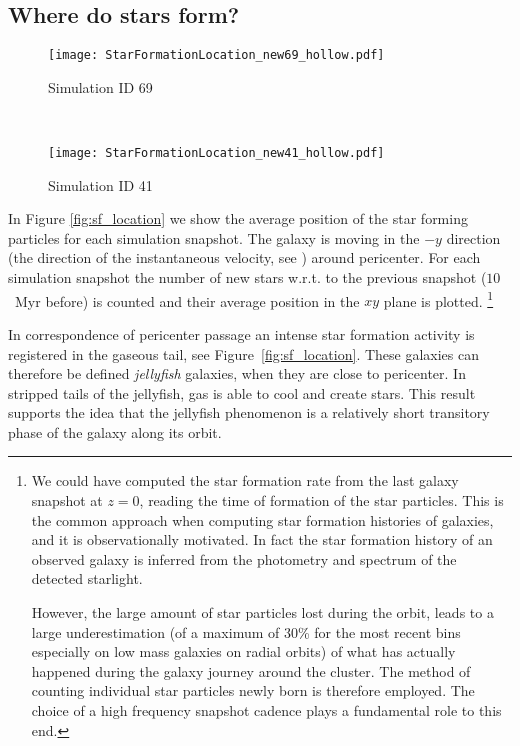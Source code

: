 \subsection{Where do stars form?}
\begin{figure*}
\centering
\begin{subfigure}[t]{0.74\textwidth}
\centering
\texttt{[image: StarFormationLocation\_new69\_hollow.pdf]}
\caption{Simulation ID 69}
\end{subfigure}\\[1.5ex]
\begin{subfigure}[t]{0.74\textwidth}
\centering
\texttt{[image: StarFormationLocation\_new41\_hollow.pdf]}
\caption{Simulation ID 41}
\end{subfigure}
\caption{Star formation location around first pericenter passage for simulation ID 69 and~41.
Each subpanel corresponds to a different pericenter.
The size of the marker is proportional to the number of stars born in that time interval.
Markers are colored according to the time from pericenter normalized with the radial period.}
\label{fig:sf_location}
\end{figure*}
In Figure \ref{fig:sf_location} we show the average position of the star forming particles for each simulation snapshot.
The galaxy is moving in the $-y$ direction (the direction of the instantaneous velocity, see ) around pericenter.
For each simulation snapshot the number of new stars w.r.t. to the previous snapshot ($10$~Myr before) is counted and their average position in the $xy$ plane is plotted.
\footnote{
We could have computed the star formation rate from the last galaxy snapshot at $z=0$, reading the time of formation of the star particles.
This is the common approach %
when computing star formation histories of galaxies, and it is observationally motivated.
In fact the star formation history of an observed galaxy is inferred from the photometry and spectrum of the detected starlight.

However, the large amount of star particles lost during the orbit, leads to a large underestimation (of a maximum of 30\% for the most recent bins especially on low mass galaxies on radial orbits) of what has actually happened during the galaxy journey around the cluster.
The method of counting individual star particles newly born is therefore employed.
The choice of a high frequency snapshot cadence plays a fundamental role to this end.
}

In correspondence of pericenter passage an intense star formation activity is registered in the gaseous tail, see Figure~\ref{fig:sf_location}.
These galaxies can therefore be defined \emph{jellyfish} galaxies, when they are close to pericenter.
In stripped tails of the jellyfish, gas is able to cool and create stars.
This result supports the idea that the jellyfish phenomenon is a relatively short transitory phase of the galaxy along its orbit.

